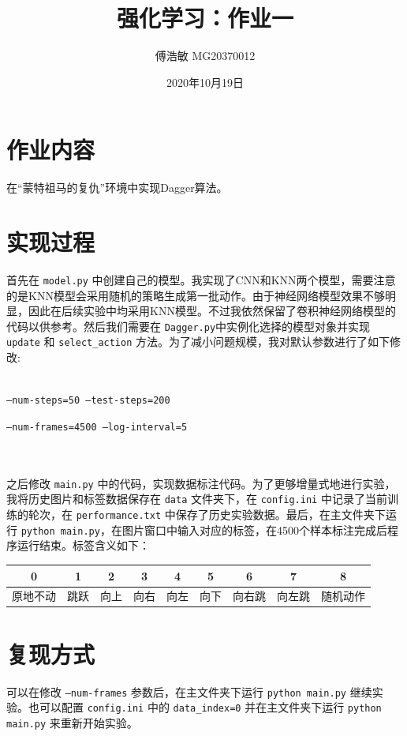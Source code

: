 \documentclass[a4paper,12pt]{article}
\begin{document}
\begin{CJK}{UTF8}{gbsn}

\title{强化学习：作业一}

\author{傅浩敏 MG20370012}

\date{2020年10月19日}

\maketitle

\section{作业内容}
在“蒙特祖马的复仇”环境中实现Dagger算法。

\section{实现过程}
首先在 \texttt{model.py} 中创建自己的模型。我实现了CNN和KNN两个模型，需要注意的是KNN模型会采用随机的策略生成第一批动作。由于神经网络模型效果不够明显，因此在后续实验中均采用KNN模型。不过我依然保留了卷积神经网络模型的代码以供参考。然后我们需要在 \texttt{Dagger.py}中实例化选择的模型对象并实现 \texttt{update} 和 \texttt{select\_action} 方法。为了减小问题规模，我对默认参数进行了如下修改:\\\\
\centerline{\texttt{--num-steps=50 --test-steps=200}}
\centerline{\texttt{--num-frames=4500 --log-interval=5}}\\\\
之后修改 \texttt{main.py} 中的代码，实现数据标注代码。为了更够增量式地进行实验，我将历史图片和标签数据保存在 \texttt{data} 文件夹下，在 \texttt{config.ini} 中记录了当前训练的轮次，在 \texttt{performance.txt} 中保存了历史实验数据。最后，在主文件夹下运行 \texttt{python main.py}，在图片窗口中输入对应的标签，在4500个样本标注完成后程序运行结束。标签含义如下：\\
\begin{table}[H]
	\begin{tabular}{@{}ccccccccc@{}}
		\toprule
		0    & 1  & 2  & 3  & 4  & 5  & 6   & 7   & 8    \\ \midrule
		原地不动 & 跳跃 & 向上 & 向右 & 向左 & 向下 & 向右跳 & 向左跳 & 随机动作 \\ \bottomrule
	\end{tabular}
\end{table}
\section{复现方式}
可以在修改 \texttt{--num-frames} 参数后，在主文件夹下运行 \texttt{python main.py} 继续实验。也可以配置 \texttt{config.ini} 中的 \texttt{data\_index=0} 并在主文件夹下运行 \texttt{python main.py} 来重新开始实验。

\end{CJK}
\end{document}
